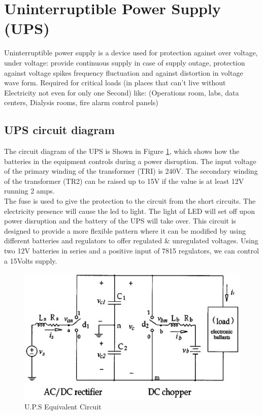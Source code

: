 \documentclass[12pt,fleqn]{book} %
\begin{document}
\section{Uninterruptible Power Supply (UPS)}
Uninterruptible power supply is a device used for protection against over voltage, under voltage: provide continuous supply in case of supply outage, protection against voltage spikes frequency fluctuation and against distortion in voltage wave form. Required for critical loads (in places that can't live without Electricity not even for only one Second) like:
 (Operations room, labs, data centers, Dialysis rooms, fire alarm control panels)
\subsection{UPS circuit diagram}
The circuit diagram of the UPS is Shown in Figure \ref{fig:hamdy 11}, which shows how the batteries in the equipment controls during a power disruption. The input voltage of the primary winding of the transformer (TRI) is 240V. The secondary winding of the transformer (TR2) can be raised up to 15V if the value is at least 12V running 2 amps. \\
The fuse is used to give the protection to the circuit from the short circuits. The electricity presence will cause the led to light. The light of LED will set off upon power disruption and the battery of the UPS will take over. This circuit is designed to provide a more flexible pattern where it can be modified by using different batteries and regulators to offer regulated & unregulated voltages. Using two 12V batteries in series and a positive input of 7815 regulators, we can control a 15Volts supply.
\begin{figure}[h!]
    \centering
    \includegraphics[width=0.5\linewidth]{hamdy 11.png}
    \caption{U.P.S Equivalent Circuit}
    \label{fig:hamdy 11}
\end{figure} 
\end{document}

